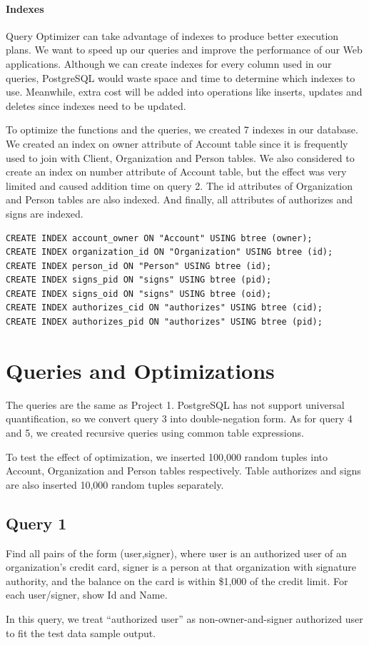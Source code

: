 \documentclass[11pt]{article}
\begin{document}
\paragraph{Indexes} Query Optimizer can take advantage of indexes to produce better execution plans. We want to speed up our queries and improve the performance of our Web applications. Although we can create indexes for every column used in our queries, PostgreSQL would waste space and time to determine which indexes to use. Meanwhile, extra cost will be added into operations like inserts, updates and deletes since indexes need to be updated.
\par
To optimize the functions and the queries, we created 7 indexes in our database. We created an index on owner attribute of Account table since it is frequently used to join with Client, Organization and Person tables. We also considered to create an index on number attribute of Account table, but the effect was very limited and caused addition time on query 2. The id attributes of Organization and Person tables are also indexed. And finally, all attributes of authorizes and signs are indexed.

\begin{verbatim}
CREATE INDEX account_owner ON "Account" USING btree (owner);
CREATE INDEX organization_id ON "Organization" USING btree (id);
CREATE INDEX person_id ON "Person" USING btree (id);
CREATE INDEX signs_pid ON "signs" USING btree (pid);
CREATE INDEX signs_oid ON "signs" USING btree (oid);
CREATE INDEX authorizes_cid ON "authorizes" USING btree (cid);
CREATE INDEX authorizes_pid ON "authorizes" USING btree (pid);
\end{verbatim}

\section{Queries and Optimizations}
\label{sec:qando}
The queries are the same as Project 1. PostgreSQL has not support universal quantification, so we convert query 3 into double-negation form. As for query 4 and 5, we created recursive queries using common table expressions.
\par
To test the effect of optimization, we inserted 100,000 random tuples into Account, Organization and Person tables respectively. Table authorizes and signs are also inserted 10,000 random tuples separately.

\subsection{Query 1}
Find all pairs of the form (user,signer), where user is an authorized user of an organization's credit card, signer is a person at that organization with signature authority, and the balance on the card is within \$1,000 of the credit limit. For each user/signer, show Id and Name.
\par
In this query, we treat ``authorized user'' as non-owner-and-signer authorized user to fit the test data sample output.
\end{document}
